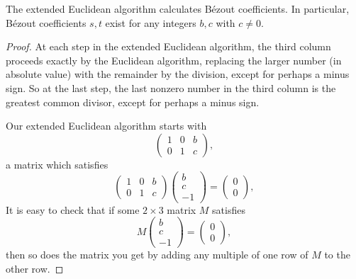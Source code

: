 \begin{theorem}\label{theorem:B\'ezout.euclidean}
The extended Euclidean algorithm calculates B\'ezout coefficients.
In particular, B\'ezout coefficients \(s,t\) exist for any integers \(b,c\) with \(c \ne 0\).
\end{theorem}
\begin{proof}
At each step in the extended Euclidean algorithm, the third column proceeds exactly by the Euclidean algorithm, replacing the larger number (in absolute value) with the remainder by the division, except for perhaps a minus sign.
So at the last step, the last nonzero number in the third column is the greatest common divisor, except for perhaps a minus sign.

Our extended Euclidean algorithm starts with
\[
\begin{pmatrix}
1 & 0 & b \\
0 & 1 & c
\end{pmatrix},
\]
a matrix which satisfies
\[
\begin{pmatrix}
1 & 0 & b \\
0 & 1 & c
\end{pmatrix}
\begin{pmatrix}
b \\
c \\
-1
\end{pmatrix}
=
\begin{pmatrix}
0 \\
0
\end{pmatrix},
\]
It is easy to check that if some \(2 \times 3\) matrix \(M\) satisfies
\[
M
\begin{pmatrix}
b \\
c \\
-1
\end{pmatrix}
=
\begin{pmatrix}
0 \\
0
\end{pmatrix},
\]
then so does the matrix you get by adding any multiple of one row of \(M\) to the other row.


\end{proof}
